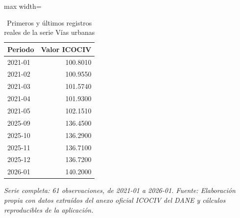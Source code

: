 \begin{table}[H]
\centering
\caption{Primeros y últimos registros reales de la serie Vías urbanas}
\label{tab:ejemplo_serie_vias_urbanas}
\scriptsize
\begin{adjustbox}{max width=\linewidth}
\begin{tabular}{lr}
\toprule
Periodo & Valor ICOCIV \\
\midrule
2021-01 & 100.8010 \\
2021-02 & 100.9550 \\
2021-03 & 101.5740 \\
2021-04 & 101.9300 \\
2021-05 & 102.1510 \\
2025-09 & 136.4500 \\
2025-10 & 136.2900 \\
2025-11 & 136.7100 \\
2025-12 & 136.7200 \\
2026-01 & 140.2000 \\
\bottomrule
\end{tabular}
\end{adjustbox}
\par\footnotesize\textit{Serie completa: 61 observaciones, de 2021-01 a 2026-01. Fuente: Elaboración propia con datos extraídos del anexo oficial ICOCIV del DANE y cálculos reproducibles de la aplicación.}
\end{table}
